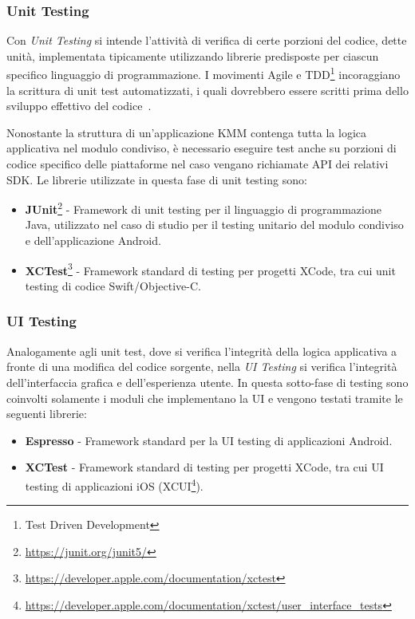 \subsubsection*{Unit Testing}
Con \textit{Unit Testing} si intende l’attività di verifica di certe porzioni del codice, 
dette unità, 
implementata tipicamente utilizzando librerie predisposte per ciascun specifico linguaggio di programmazione. 
I movimenti Agile e TDD\footnote{Test Driven Development} incoraggiano la scrittura di unit test automatizzati, 
i quali dovrebbero essere scritti prima dello sviluppo effettivo del codice~\cite{martin2017clean}.

Nonostante la struttura di un'applicazione KMM contenga tutta la logica applicativa nel modulo condiviso, 
è necessario eseguire test anche su porzioni di codice specifico delle piattaforme nel caso vengano richiamate API dei relativi SDK. 
Le librerie utilizzate in questa fase di unit testing sono:

\begin{itemize}
    \item \textbf{JUnit}\footnote{\href{https://junit.org/junit5/}{https://junit.org/junit5/}} - Framework di unit testing per il linguaggio di programmazione Java, utilizzato nel caso di studio per il testing unitario del modulo condiviso e dell'applicazione Android.
    
    \item \textbf{XCTest}\footnote{\href{https://developer.apple.com/documentation/xctest}{https://developer.apple.com/documentation/xctest}} - Framework standard di testing per progetti XCode, tra cui unit testing di codice Swift/Objective-C.
\end{itemize}

\subsubsection*{UI Testing}
Analogamente agli unit test, 
dove si verifica l'integrità della logica applicativa a fronte di una modifica del codice sorgente, 
nella \textit{UI Testing} si verifica l'integrità dell'interfaccia grafica e dell'esperienza utente. 
In questa sotto-fase di testing sono coinvolti solamente i moduli che implementano la UI e vengono testati tramite le seguenti librerie:

\begin{itemize}
    \item \textbf{Espresso} - Framework standard per la UI testing di applicazioni Android.
    
    \item \textbf{XCTest} - Framework standard di testing per progetti XCode, tra cui UI testing di applicazioni iOS (XCUI\footnote{\href{https://developer.apple.com/documentation/xctest/user\_interface\_tests}{https://developer.apple.com/documentation/xctest/user\_interface\_tests}}).
\end{itemize}

